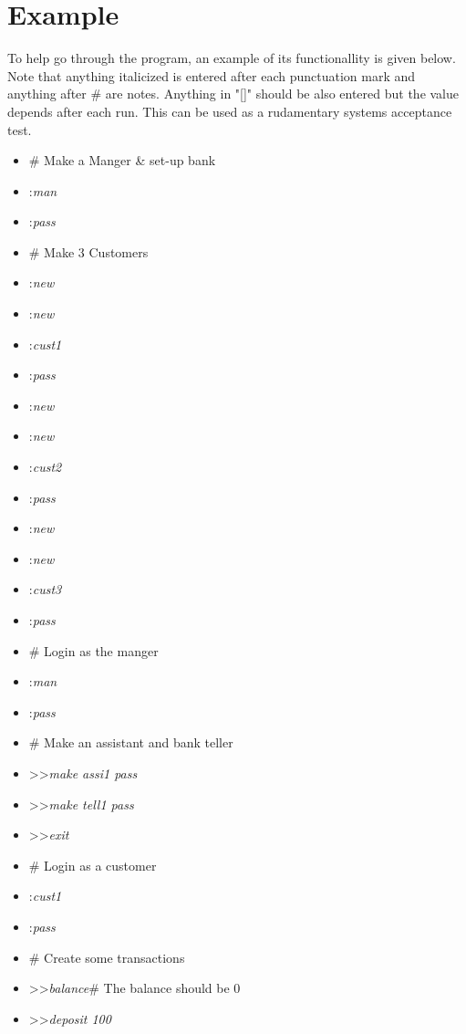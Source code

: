 \documentclass[letterpaper,10pt,english]{sphinxmanual}
\begin{document}
\newpage

\section{Example}
\label{\detokenize{intro:example}}\label{\detokenize{intro::doc}}
To help go through the program, an example of its functionallity is given below.  Note that anything italicized is entered after each punctuation mark and anything after \# are notes.  Anything in "[]" should be also entered but the value depends after each run.  This can be used as a rudamentary systems acceptance test.
\begin{itemize}
\item{\# Make a Manger \& set-up bank}
\item{:\textit{man}}
\item{:\textit{pass}}
\item{\# Make 3 Customers}
\item{:\textit{new}}
\item{:\textit{new}}
\item{:\textit{cust1}}
\item{:\textit{pass}}
\item{:\textit{new}}
\item{:\textit{new}}
\item{:\textit{cust2}}
\item{:\textit{pass}}
\item{:\textit{new}}
\item{:\textit{new}}
\item{:\textit{cust3}}
\item{:\textit{pass}}
\item{\# Login as the manger}
\item{:\textit{man}}
\item{:\textit{pass}}
\item{\# Make an assistant and bank teller}
\item{>>\textit{make assi1 pass}}
\item{>>\textit{make tell1 pass}}
\item{>>\textit{exit}}
\item{\# Login as a customer}
\item{:\textit{cust1}}
\item{:\textit{pass}}
\item{\# Create some transactions}
\item{>>\textit{balance}\# The balance should be 0}
\item{>>\textit{deposit 100}}

\end{itemize}
\end{document}
